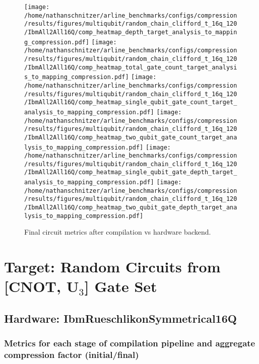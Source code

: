\documentclass{report}%
\begin{document}
\begin{figure}[h!]%
\centering%
\texttt{[image: /home/nathanschnitzer/arline\_benchmarks/configs/compression/results/figures/multiqubit/random\_chain\_clifford\_t\_16q\_120/IbmAll2All16Q/comp\_heatmap\_depth\_target\_analysis\_to\_mapping\_compression.pdf]}%
\centering%
\texttt{[image: /home/nathanschnitzer/arline\_benchmarks/configs/compression/results/figures/multiqubit/random\_chain\_clifford\_t\_16q\_120/IbmAll2All16Q/comp\_heatmap\_total\_gate\_count\_target\_analysis\_to\_mapping\_compression.pdf]}%
\linebreak%
\centering%
\texttt{[image: /home/nathanschnitzer/arline\_benchmarks/configs/compression/results/figures/multiqubit/random\_chain\_clifford\_t\_16q\_120/IbmAll2All16Q/comp\_heatmap\_single\_qubit\_gate\_count\_target\_analysis\_to\_mapping\_compression.pdf]}%
\centering%
\texttt{[image: /home/nathanschnitzer/arline\_benchmarks/configs/compression/results/figures/multiqubit/random\_chain\_clifford\_t\_16q\_120/IbmAll2All16Q/comp\_heatmap\_two\_qubit\_gate\_count\_target\_analysis\_to\_mapping\_compression.pdf]}%
\linebreak%
\centering%
\texttt{[image: /home/nathanschnitzer/arline\_benchmarks/configs/compression/results/figures/multiqubit/random\_chain\_clifford\_t\_16q\_120/IbmAll2All16Q/comp\_heatmap\_single\_qubit\_gate\_depth\_target\_analysis\_to\_mapping\_compression.pdf]}%
\centering%
\texttt{[image: /home/nathanschnitzer/arline\_benchmarks/configs/compression/results/figures/multiqubit/random\_chain\_clifford\_t\_16q\_120/IbmAll2All16Q/comp\_heatmap\_two\_qubit\_gate\_depth\_target\_analysis\_to\_mapping\_compression.pdf]}%
\linebreak%
\caption{Final circuit metrics after compilation vs hardware backend.}%
\end{figure}

%
\chapter{Target: Random Circuits from [CNOT, U$_3$] Gate Set}%
\label{chap:TargetRandomCircuitsfromCNOT,U3GateSet}%
\section{Hardware: IbmRueschlikonSymmetrical16Q}%
\label{sec:HardwareIbmRueschlikonSymmetrical16Q}%

%
\subsection*{Metrics for each stage of compilation pipeline and aggregate compression factor
                    (initial/final)}%
\label{subsec:Metricsforeachstageofcompilationpipelineandaggregatecompressionfactor(initial/final)}%
\end{document}
